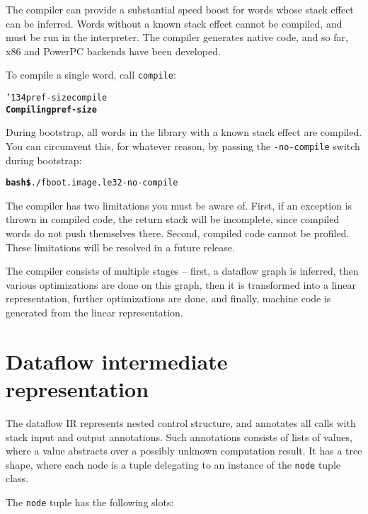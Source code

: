 \documentclass{book}
\newcommand{\bs}{\char'134}
\begin{document}
The compiler can provide a substantial speed boost for words whose stack effect can be inferred. Words without a known stack effect cannot be compiled, and must be run in the interpreter. The compiler generates native code, and so far, x86 and PowerPC backends have been developed.

To compile a single word, call \texttt{compile}:

\begin{alltt}
  \bs pref-size compile
\textbf{Compiling pref-size}
\end{alltt}

During bootstrap, all words in the library with a known stack effect are compiled. You can
circumvent this, for whatever reason, by passing the \texttt{-no-compile} switch during
bootstrap:

\begin{alltt}
\textbf{bash\$} ./f boot.image.le32 -no-compile
\end{alltt}

The compiler has two limitations you must be aware of. First, if an exception is thrown in compiled code, the return stack will be incomplete, since compiled words do not push themselves there. Second, compiled code cannot be profiled. These limitations will be resolved in a future release.

The compiler consists of multiple stages -- first, a dataflow graph is inferred, then various optimizations are done on this graph, then it is transformed into a linear representation, further optimizations are done, and finally, machine code is generated from the linear representation.

\section{Dataflow intermediate representation}

The dataflow IR represents nested control structure, and annotates all calls with stack input and output annotations. Such annotations consists of lists of values, where a value abstracts over a possibly unknown computation result. It has a tree shape, where each node is a tuple delegating to an instance of the \verb|node| tuple class.

The \verb|node| tuple has the following slots:
\end{document}

